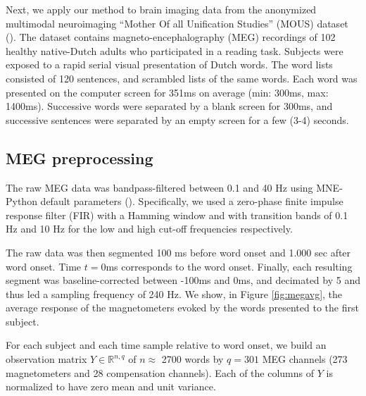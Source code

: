
Next, we apply our method to brain imaging data from the anonymized multimodal
neuroimaging ``Mother Of all Unification Studies'' (MOUS) dataset
(\cite{schoffelen2019204}).  The dataset contains magneto-encephalography (MEG)
recordings of 102 healthy native-Dutch adults who participated in a reading
task.
%
Subjects were exposed to a rapid serial visual presentation of Dutch words. The
word lists consisted of 120 sentences, and scrambled lists of the same words.
Each word was presented on the computer screen for 351ms on average (min: 300ms,
max: 1400ms).  Successive words were separated by a blank screen for 300ms, and
successive sentences were separated by an empty screen for a few (3-4) seconds.

\subsection{MEG preprocessing}

The raw MEG data was bandpass-filtered between 0.1 and 40 Hz using MNE-Python
default parameters (\cite{gramfort2013meg, gramfort2014mne}). Specifically, we used a zero-phase finite impulse
response filter (FIR) with a Hamming window and with transition bands of 0.1 Hz
and 10 Hz for the low and high cut-off frequencies respectively.

The raw data was then segmented 100 ms before word onset and 1.000 sec after
word onset. Time $t=0$ms corresponds to the word onset. Finally, each resulting
segment was baseline-corrected between -100ms and 0ms, and decimated by 5 and
thus led a sampling frequency of 240 Hz. We show, in Figure \ref{fig:megavg},
the average response of the magnetometers evoked by the words presented to the
first subject.

For each subject and each time sample relative to word onset, we
build an observation matrix $Y \in \mathbb{R}^{n, q}$ of $n\approx$ 2700 words
by $q=301$ MEG channels (273 magnetometers and 28 compensation channels). Each
of the columns of $Y$ is normalized to have zero mean and unit variance.

